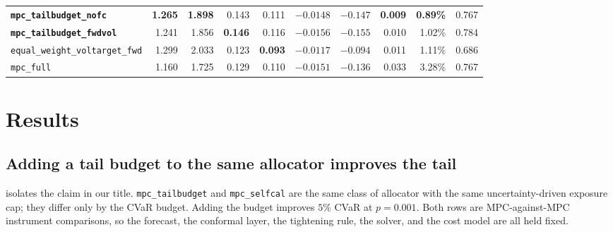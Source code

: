 \documentclass[journal]{IEEEtran}
\newcommand{\ours}[1]{\textcolor{blue!70!black}{\textbf{#1}}}
\newcommand{\best}[1]{\textbf{#1}}
\begin{document}
\begin{table}[!t]
\begin{tabular}{lrrrrrrrrr}
    \ours{\texttt{mpc\_tailbudget\_nofc}}   & \best{1.265} & \best{1.898} & 0.143 & 0.111 & $-0.0148$ & $-0.147$ & \best{0.009} & \best{0.89\%} & 0.767 \\
    \ours{\texttt{mpc\_tailbudget\_fwdvol}} & 1.241 & 1.856 & \best{0.146} & 0.116 & $-0.0156$ & $-0.155$ & 0.010 & 1.02\% & 0.784 \\
    \texttt{equal\_weight\_voltarget\_fwd} & 1.299 & 2.033 & 0.123 & \best{0.093} & \best{$-0.0117$} & \best{$-0.094$} & 0.011 & 1.11\% & 0.686 \\
    \texttt{mpc\_full}                  & 1.160 & 1.725 & 0.129 & 0.110 & $-0.0151$ & $-0.136$ & 0.033 & 3.28\% & 0.767 \\
    \bottomrule
  \end{tabular}
\end{table}

\section{Results}
\label{sec:results}

\subsection{Adding a tail budget to the same allocator improves the tail}

 isolates the claim in our title. \texttt{mpc\_tailbudget} and
\texttt{mpc\_selfcal} are the same class of allocator with the same
uncertainty-driven exposure cap; they differ only by the CVaR budget. Adding the
budget improves $5\%$ CVaR at $p=0.001$. Both rows are MPC-against-MPC instrument
comparisons, so the forecast, the conformal layer, the tightening rule, the solver,
and the cost model are all held fixed.
\end{document}

